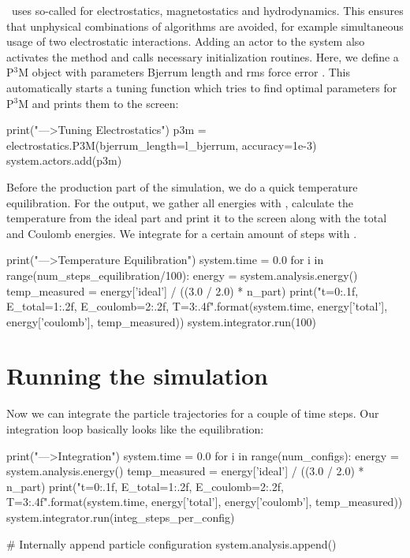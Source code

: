 \documentclass[
a4paper,                        %
11pt,                           %
twoside,                        %
footsepline,                    %
headsepline,                    %
headexclude,                    %
footexclude,                    %
pagesize,                       %
]{scrartcl}
\begin{document}
\es\ uses so-called  for electrostatics, magnetostatics and
hydrodynamics. This ensures that unphysical combinations of algorithms are
avoided, for example simultaneous usage of two electrostatic interactions.
Adding an actor to the system also activates the method and calls necessary
initialization routines. Here, we define a P$^3$M object with parameters Bjerrum
length and rms force error . This automatically starts a
tuning function which tries to find optimal parameters for P$^3$M and prints them
to the screen:

\begin{pypresso}
print("\n--->Tuning Electrostatics")
p3m = electrostatics.P3M(bjerrum_length=l_bjerrum, 
                         accuracy=1e-3)
system.actors.add(p3m)
\end{pypresso}

Before the production part of the simulation, we do a quick temperature 
equilibration. For the output, we gather all energies with
, calculate the temperature from the ideal part and 
print it to the screen along with the total and Coulomb energies.
We integrate for a certain amount of steps with .



\begin{pypresso}
print("\n--->Temperature Equilibration")
system.time = 0.0
for i in range(num_steps_equilibration/100):
    energy = system.analysis.energy()
    temp_measured = energy['ideal'] / ((3.0 / 2.0) * n_part)
    print("t={0:.1f}, E_total={1:.2f}, E_coulomb={2:.2f}, 
          T={3:.4f}".format(system.time, energy['total'], 
          energy['coulomb'], temp_measured))
    system.integrator.run(100)
\end{pypresso}

\section{Running the simulation}

Now we can integrate the particle trajectories for a couple of time
steps. Our integration loop basically looks like the equilibration:

\begin{pypresso}
print("\n--->Integration")
system.time = 0.0
for i in range(num_configs):
    energy = system.analysis.energy()
    temp_measured = energy['ideal'] / ((3.0 / 2.0) * n_part)
    print("t={0:.1f}, E_total={1:.2f}, E_coulomb={2:.2f},
            T={3:.4f}".format(system.time, energy['total'],
            energy['coulomb'], temp_measured))
    system.integrator.run(integ_steps_per_config)

    # Internally append particle configuration
    system.analysis.append()
\end{pypresso}
\end{document}

